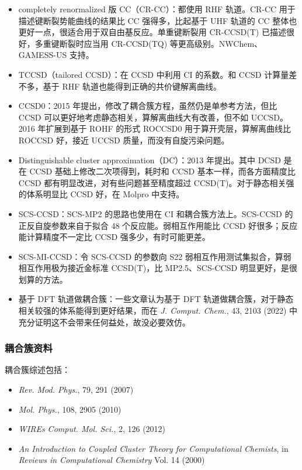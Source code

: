 \begin{itemize}
  \item completely renormalized 版 CC（CR-CC）：都使用 RHF 轨道。CR-CC 用于描述键断裂势能曲线的结果比 CC 强得多，比起基于 UHF 轨道的 CC 整体也更好一点，很适合用于双自由基反应。单重键断裂用 CR-CCSD(T) 已描述很好，多重键断裂时应当用 CR-CCSD(TQ) 等更高级别。NWChem、GAMESS-US 支持。
  \item TCCSD（tailored CCSD）：在 CCSD 中利用 CI 的系数。和 CCSD 计算量差不多，基于 RHF 轨道也能得到正确的共价键解离曲线。
  \item CCSD0：2015 年提出，修改了耦合簇方程，虽然仍是单参考方法，但比 CCSD 可以更好地考虑静态相关，算解离曲线大有改善，但不如 UCCSD。2016 年扩展到基于 ROHF 的形式 ROCCSD0 用于算开壳层，算解离曲线比 ROCCSD 好，接近 UCCSD 质量，而没有自旋污染问题。
  \item Distinguishable cluster approximation（DC）：2013 年提出。其中 DCSD 是在 CCSD 基础上修改二次项得到，耗时和 CCSD 基本一样，而各方面精度比 CCSD 都有明显改进，对有些问题甚至精度超过 CCSD(T)。对于静态相关强的体系明显比 CCSD 好，在 Molpro 中支持。
  \item SCS-CCSD：SCS-MP2 的思路也使用在 CI 和耦合簇方法上。SCS-CCSD 的正反自旋参数来自于拟合 48 个反应能。弱相互作用能比 CCSD 好很多；反应能计算精度不一定比 CCSD 强多少，有时可能更差。
  \item SCS-MI-CCSD：令 SCS-CCSD 的参数向 S22 弱相互作用测试集拟合，算弱相互作用极为接近金标准 CCSD(T)，比 MP2.5、SCS-CCSD 明显更好，是很划算的方法。
  \item 基于 DFT 轨道做耦合簇：一些文章认为基于 DFT 轨道做耦合簇，对于静态相关较强的体系能得到更好结果，而在 \textit{J. Comput. Chem.}, 43, 2103 (2022) 中充分证明这不会带来任何益处，故没必要效仿。
\end{itemize}

\subsubsection*{耦合簇资料}

耦合簇综述包括：
\begin{itemize}
  \item \textit{Rev. Mod. Phys.}, 79, 291 (2007)
  \item \textit{Mol. Phys.}, 108, 2905 (2010)
  \item \textit{WIREs Comput. Mol. Sci.}, 2, 126 (2012)
  \item \textit{An Introduction to Coupled Cluster Theory for Computational Chemists}, in \textit{Reviews in Computational Chemistry} Vol. 14 (2000)
\end{itemize}

